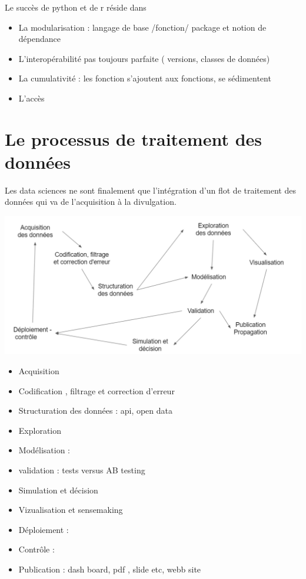 \documentclass[
]{book}
\providecommand{\tightlist}{%
  \setlength{\itemsep}{0pt}\setlength{\parskip}{0pt}}
\begin{document}
Le succès de python et de r réside dans

\begin{itemize}
\tightlist
\item
  La modularisation : langage de base /fonction/ package et notion de dépendance
\item
  L'interopérabilité pas toujours parfaite ( versions, classes de données)
\item
  La cumulativité : les fonction s'ajoutent aux fonctions, se sédimentent
\item
  L'accès
\end{itemize}

\hypertarget{le-processus-de-traitement-des-donnuxe9es}{%
\section{Le processus de traitement des données}\label{le-processus-de-traitement-des-donnuxe9es}}

Les data sciences ne sont finalement que l'intégration d'un flot de traitement des données qui va de l'acquisition à la divulgation.

\includegraphics{./Images/datascience2.png}

\begin{itemize}
\tightlist
\item
  Acquisition
\item
  Codification , filtrage et correction d'erreur
\item
  Structuration des données : api, open data
\item
  Exploration
\item
  Modélisation :
\item
  validation : tests versus AB testing
\item
  Simulation et décision
\item
  Vizualisation et sensemaking
\item
  Déploiement :
\item
  Contrôle :
\item
  Publication : dash board, pdf , slide etc, webb site
\end{itemize}
\end{document}
